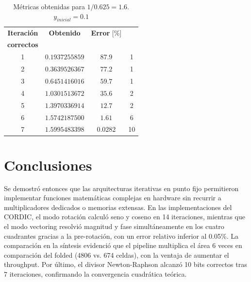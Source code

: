 \documentclass[12pt,a4paper]{article}
\begin{document}
\begin{table}[H]
    \centering
    \begin{tabular}{c|ccc} \toprule
        \textbf{Iteración} & \textbf{Obtenido} & \textbf{Error} [\%] & \shortstack{\textbf{Nro. de bits} \\ \textbf{correctos}} \\ \midrule
        1 & $0.1937255859$ & $87.9$ & 1 \\
        2 & $0.3639526367$ & $77.2$ & 1 \\
        3 & $0.6451416016$ & $59.7$ & 1 \\
        4 & $1.0301513672$ & $35.6$ & 2 \\
        5 & $1.3970336914$ & $12.7$ & 2 \\
        6 & $1.5742187500$ & $1.61$ & 6 \\
        7 & $1.5995483398$ & $0.0282$ & 10 \\ \bottomrule
    \end{tabular}
    \caption{Métricas obtenidas para $1/0.625 = 1.6$. $y_{inicial} = 0.1$}
    \label{tab:nr}
\end{table}

\section{Conclusiones}                                              \label{sec_3}
Se demostró entonces que las arquitecturas iterativas en punto fijo permitieron implementar funciones matemáticas complejas en hardware sin recurrir a multiplicadores dedicados o memorias extensas. En las implementaciones del CORDIC, el modo rotación calculó seno y coseno en 14 iteraciones, mientras que el modo vectoring resolvió magnitud y fase simultáneamente en los cuatro cuadrantes gracias a la pre-rotación, con un error relativo inferior al 0.05\%. La comparación en la síntesis evidenció que el pipeline multiplica el área 6 veces en comparación del folded (4806 vs. 674 celdas), con la ventaja de aumentar el throughput. Por último, el divisor Newton-Raphson alcanzó 10 bits correctos tras 7 iteraciones, confirmando la convergencia cuadrática teórica.



\newpage
\nocite{*}
\printbibliography[heading=bibintoc, title={4. \ Referencias}]
\end{document}

